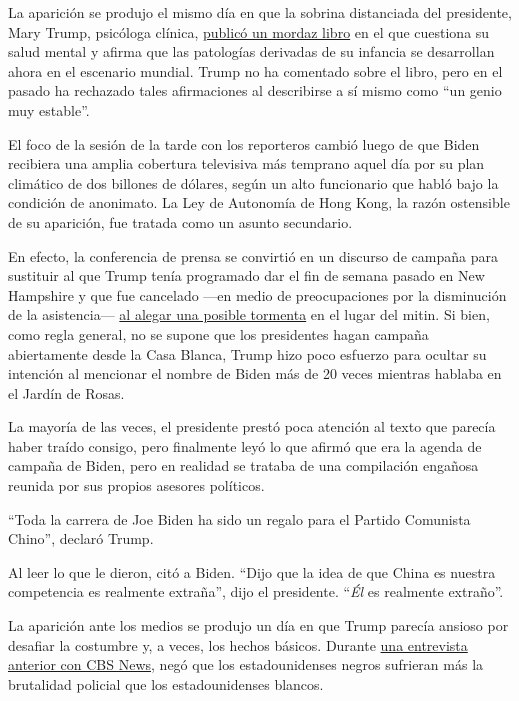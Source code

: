 La aparición se produjo el mismo día en que la sobrina distanciada del
presidente, Mary Trump, psicóloga clínica,
\href{https://www.nytimes.com/es/2020/07/08/espanol/mundo/libro-sobre-donald-trump.html}{publicó
un mordaz libro} en el que cuestiona su salud mental y afirma que las
patologías derivadas de su infancia se desarrollan ahora en el escenario
mundial. Trump no ha comentado sobre el libro, pero en el pasado ha
rechazado tales afirmaciones al describirse a sí mismo como ``un genio
muy estable''.

El foco de la sesión de la tarde con los reporteros cambió luego de que
Biden recibiera una amplia cobertura televisiva más temprano aquel día
por su plan climático de dos billones de dólares, según un alto
funcionario que habló bajo la condición de anonimato. La Ley de
Autonomía de Hong Kong, la razón ostensible de su aparición, fue tratada
como un asunto secundario.

En efecto, la conferencia de prensa se convirtió en un discurso de
campaña para sustituir al que Trump tenía programado dar el fin de
semana pasado en New Hampshire y que fue cancelado ---en medio de
preocupaciones por la disminución de la asistencia---
\href{https://www.nytimes.com/2020/07/10/us/politics/trump-nh-rally-postponed.html}{al
alegar una posible tormenta} en el lugar del mitin. Si bien, como regla
general, no se supone que los presidentes hagan campaña abiertamente
desde la Casa Blanca, Trump hizo poco esfuerzo para ocultar su intención
al mencionar el nombre de Biden más de 20 veces mientras hablaba en el
Jardín de Rosas.

La mayoría de las veces, el presidente prestó poca atención al texto que
parecía haber traído consigo, pero finalmente leyó lo que afirmó que era
la agenda de campaña de Biden, pero en realidad se trataba de una
compilación engañosa reunida por sus propios asesores políticos.

``Toda la carrera de Joe Biden ha sido un regalo para el Partido
Comunista Chino'', declaró Trump.

Al leer lo que le dieron, citó a Biden. ``Dijo que la idea de que China
es nuestra competencia es realmente extraña'', dijo el presidente.
``\emph{Él} es realmente extraño''.

La aparición ante los medios se produjo un día en que Trump parecía
ansioso por desafiar la costumbre y, a veces, los hechos básicos.
Durante
\href{https://www.cbsnews.com/news/trump-black-americans-killed-police-white-too/}{una
entrevista anterior con CBS News,} negó que los estadounidenses negros
sufrieran más la brutalidad policial que los estadounidenses blancos.

